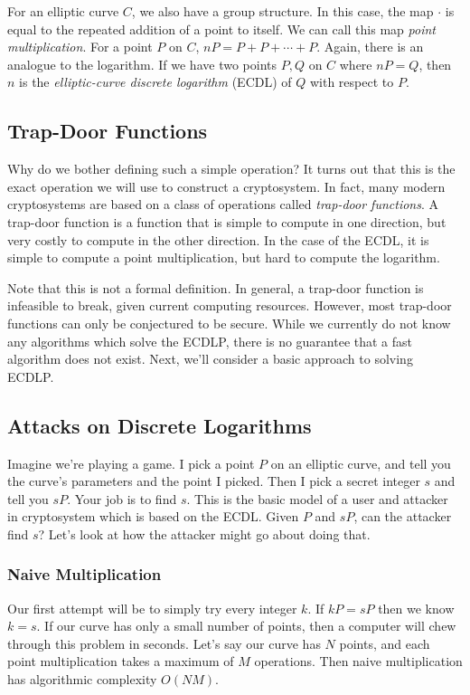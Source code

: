 \documentclass{article}
\begin{document}
For an elliptic curve $C$, we also have a group structure. 
In this case, the map $\cdot$ is equal to the repeated addition of a point to itself. 
We can call this map \textit{point multiplication}.
For a point $P$ on $C$, $nP = P + P + \cdots + P$.
Again, there is an analogue to the logarithm.
If we have two points $P,Q$ on $C$ where $nP = Q$, then $n$ is the \textit{elliptic-curve discrete logarithm} (ECDL) of $Q$ with respect to $P$.

\subsection{Trap-Door Functions}
Why do we bother defining such a simple operation?
It turns out that this is the exact operation we will use to construct a cryptosystem.
In fact, many modern cryptosystems are based on a class of operations called \textit{trap-door functions}.
A trap-door function is a function that is simple to compute in one direction, but very costly to compute in the other direction.
In the case of the ECDL, it is simple to compute a point multiplication, but hard to compute the logarithm.

Note that this is not a formal definition.
In general, a trap-door function is infeasible to break, given current computing resources.
However, most trap-door functions can only be conjectured to be secure.
While we currently do not know any algorithms which solve the ECDLP, there is no guarantee that a fast algorithm does not exist.
Next, we'll consider a basic approach to solving ECDLP.

\subsection{Attacks on Discrete Logarithms}
Imagine we're playing a game.
I pick a point $P$ on an elliptic curve, and tell you the curve's parameters and the point I picked.
Then I pick a secret integer $s$ and tell you $sP$. Your job is to find $s$.
This is the basic model of a user and attacker in cryptosystem which is based on the ECDL.
Given $P$ and $sP$, can the attacker find $s$? Let's look at how the attacker might go about doing that.

\subsubsection{Naive Multiplication}
Our first attempt will be to simply try every integer $k$.
If $kP = sP$ then we know $k = s$.
If our curve has only a small number of points, then a computer will chew through this problem in seconds.
Let's say our curve has $N$ points, and each point multiplication takes a maximum of $M$ operations.
Then naive multiplication has algorithmic complexity $O(NM)$.
\end{document}
